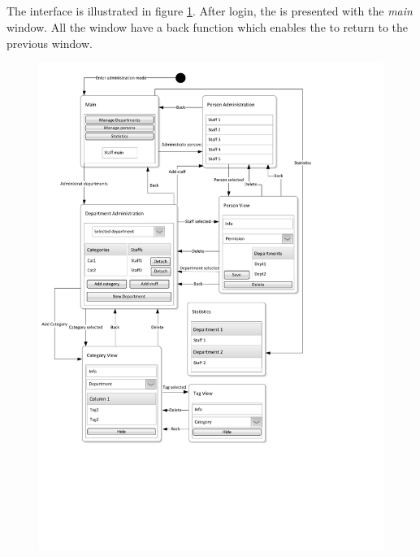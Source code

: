 

\subsection{\ainterface}
\label{sec:admininterface}
The \admin[] interface is illustrated in figure \ref{fig:admin_interface}.
After login, the \admin[] is presented with the \textit{main} window. All the window have a back function which enables the \admin[] to return to the previous window.


\begin{figure}[p]
	\centering
		\includegraphics[width = \textwidth, clip=true, trim=0 4cm 5cm 0]{input/application_domain_analysis/Navigation_DiagramAdmin.pdf}
	\label{fig:admin_interface} %
\end{figure}

